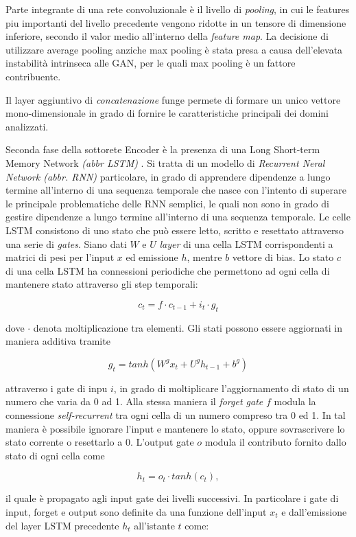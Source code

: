 Parte integrante di una rete convoluzionale è il livello di \textit{pooling}, in cui le features piu importanti del livello precedente vengono ridotte in un tensore di dimensione inferiore, secondo il valor medio all'interno della \textit{feature map}. La decisione di utilizzare average pooling anziche max pooling è stata presa a causa dell'elevata instabilità intrinseca alle GAN, per le quali max pooling è un fattore contribuente. 

Il layer aggiuntivo di \textit{concatenazione} funge permete di formare un unico vettore mono-dimensionale in grado di fornire le caratteristiche principali dei domini analizzati.

Seconda fase della sottorete Encoder è la presenza di una Long Short-term Memory Network \textit{(abbr LSTM)} \cite{LSTM}. Si tratta di un modello di \textit{Recurrent Neral Network (abbr. RNN)} particolare, in grado di apprendere dipendenze a lungo termine all'interno di una sequenza temporale che nasce con l'intento di superare le principale problematiche delle RNN semplici, le quali non sono in grado di gestire dipendenze a lungo termine all'interno di una sequenza temporale. Le celle LSTM consistono di uno stato che può essere letto, scritto e resettato attraverso una serie di \textit{gates}. Siano dati $W$ e $U$ \textit{layer} di una cella LSTM corrispondenti a matrici di pesi per l'input $x$ ed emissione $h$, mentre $b$ vettore di bias. Lo stato $c$ di una cella LSTM ha connessioni periodiche che permettono ad ogni cella di mantenere stato attraverso gli step temporali:

\[c_t = f \cdot c_{t-1} + i_t \cdot g_t\]

dove $\cdot$ denota moltiplicazione tra elementi. Gli stati possono essere aggiornati in maniera additiva tramite

\[g_t = tanh(W^gx_t + U^gh_{t-1}+b^g)\]


attraverso i gate di inpu $i$, in grado di moltiplicare l'aggiornamento di stato di un numero che varia da 0 ad 1. Alla stessa maniera il \textit{forget gate} $f$ modula la connessione \textit{self-recurrent} tra ogni cella di un numero compreso tra 0 ed 1. In tal maniera è possibile ignorare l'input e mantenere lo stato, oppure sovrascrivere lo stato corrente o resettarlo a 0.
L'output gate $o$ modula il contributo fornito dallo stato di ogni cella come

\[h_t = o_t \cdot tanh(c_t),\]

il quale è propagato agli input gate dei livelli successivi. In particolare i gate di input, forget e output sono definite da una funzione dell'input $x_t$  e dall'emissione del layer LSTM precedente $h_t$ all'istante $t$ come:

